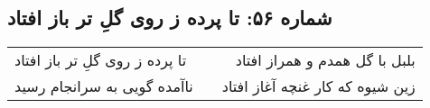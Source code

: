 \begin{center}
\section*{شماره ۵۶: تا پرده ز روی گلِ تر باز افتاد}
\label{sec:056}
\begin{longtable}{l p{0.5cm} r}
تا پرده ز روی گلِ تر باز افتاد
&&
بلبل با گل همدم و همراز افتاد
\\
ناآمده گویی به سرانجام رسید
&&
زین شیوه که کار غنچه آغاز افتاد
\\
\end{longtable}
\end{center}
